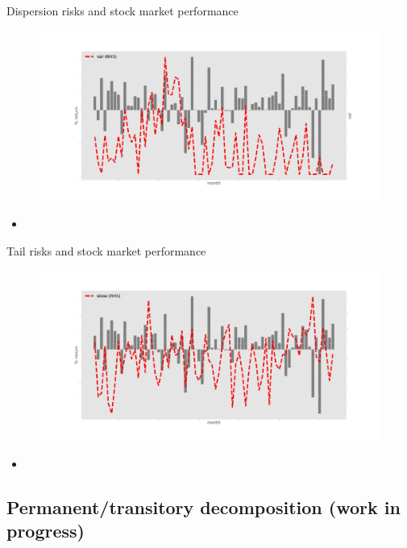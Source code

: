 \documentclass{beamer}
\begin{document}
\begin{frame}{Dispersion risks and stock market performance}
	\begin{figure}
		\centering
		\label{ts_var}
		\includegraphics[width=\textwidth]{figures/tsMedvar.jpg}
	\end{figure}
	\begin{itemize}
		\item 
	\end{itemize}
\end{frame}



\begin{frame}{Tail risks and stock market performance}
	\begin{figure}
		\centering
		\label{ts_skew}
		\includegraphics[width=\textwidth]{figures/tsEstMeanskew.jpg}
	\end{figure}
	\begin{itemize}
		\item 
	\end{itemize}
\end{frame}


\subsection{Permanent/transitory decomposition (work in progress)}
\end{document}
